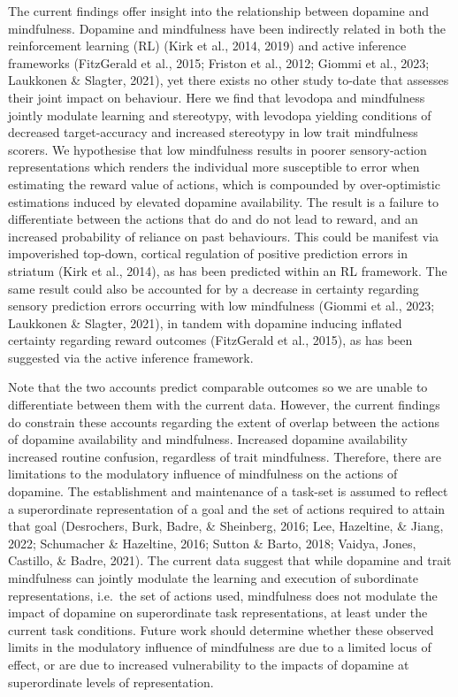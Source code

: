 \documentclass[
  man]{apa6}
\begin{document}
The current findings offer insight into the relationship between dopamine and mindfulness. Dopamine and mindfulness have been indirectly related in both the reinforcement learning (RL) (Kirk et al., 2014, 2019) and active inference frameworks (FitzGerald et al., 2015; Friston et al., 2012; Giommi et al., 2023; Laukkonen \& Slagter, 2021), yet there exists no other study to-date that assesses their joint impact on behaviour. Here we find that levodopa and mindfulness jointly modulate learning and stereotypy, with levodopa yielding conditions of decreased target-accuracy and increased stereotypy in low trait mindfulness scorers. We hypothesise that low mindfulness results in poorer sensory-action representations which renders the individual more susceptible to error when estimating the reward value of actions, which is compounded by over-optimistic estimations induced by elevated dopamine availability. The result is a failure to differentiate between the actions that do and do not lead to reward, and an increased probability of reliance on past behaviours. This could be manifest via impoverished top-down, cortical regulation of positive prediction errors in striatum (Kirk et al., 2014), as has been predicted within an RL framework. The same result could also be accounted for by a decrease in certainty regarding sensory prediction errors occurring with low mindfulness (Giommi et al., 2023; Laukkonen \& Slagter, 2021), in tandem with dopamine inducing inflated certainty regarding reward outcomes (FitzGerald et al., 2015), as has been suggested via the active inference framework.

Note that the two accounts predict comparable outcomes so we are unable to differentiate between them with the current data. However, the current findings do constrain these accounts regarding the extent of overlap between the actions of dopamine availability and mindfulness. Increased dopamine availability increased routine confusion, regardless of trait mindfulness. Therefore, there are limitations to the modulatory influence of mindfulness on the actions of dopamine. The establishment and maintenance of a task-set is assumed to reflect a superordinate representation of a goal and the set of actions required to attain that goal (Desrochers, Burk, Badre, \& Sheinberg, 2016; Lee, Hazeltine, \& Jiang, 2022; Schumacher \& Hazeltine, 2016; Sutton \& Barto, 2018; Vaidya, Jones, Castillo, \& Badre, 2021). The current data suggest that while dopamine and trait mindfulness can jointly modulate the learning and execution of subordinate representations, i.e.~the set of actions used, mindfulness does not modulate the impact of dopamine on superordinate task representations, at least under the current task conditions. Future work should determine whether these observed limits in the modulatory influence of mindfulness are due to a limited locus of effect, or are due to increased vulnerability to the impacts of dopamine at superordinate levels of representation.
\end{document}
